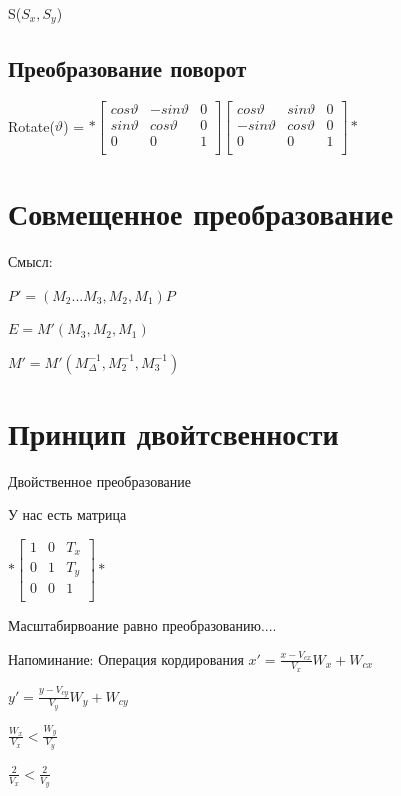 \documentclass{article}
\begin{document}
S($S_x,S_y$) 

\subsection{Преобразование поворот}

Rotate($\vartheta$) = 
$*\begin{bmatrix}
    cos \vartheta & -sin \vartheta  & 0 \\[0.3em]
    sin \vartheta &  cos \vartheta  & 0 \\[0.3em]
    0 & 0  & 1 \\[0.3em]
\end{bmatrix}
\begin{bmatrix}
    cos \vartheta & sin \vartheta  & 0 \\[0.3em]
    -sin \vartheta &  cos \vartheta  & 0 \\[0.3em]
    0 & 0  & 1 \\[0.3em]
\end{bmatrix}*$


\section{Совмещенное преобразование}

Смысл:

$P' = (M_2...M_3,M_2,M_1)P$

$E = M' (M_3,M_2,M_1)$

$M' = M' (M_{\Delta }^{-1}, M_{2}^{-1},M_{3}^{-1})$


\section{Принцип двойтсвенности}
Двойственное преобразование

У нас есть матрица

$*\begin{bmatrix}
    1 & 0 & T_x \\
    0 & 1 & T_y \\
    0 & 0 & 1 \\
\end{bmatrix}*$

Масштабирвоание равно преобразованию....


Напоминание: Операция кордирования $x' = \frac{x-V_{cx}}{V_x} W_x + W_{cx}$

$y' = \frac{y-V_{cy}}{V_y} W_y + W_{cy}$

$\frac{W_x}{V_x} < \frac{W_y}{V_y}$


$\frac{2}{V_x} < \frac{2}{V_y}$
\end{document}
